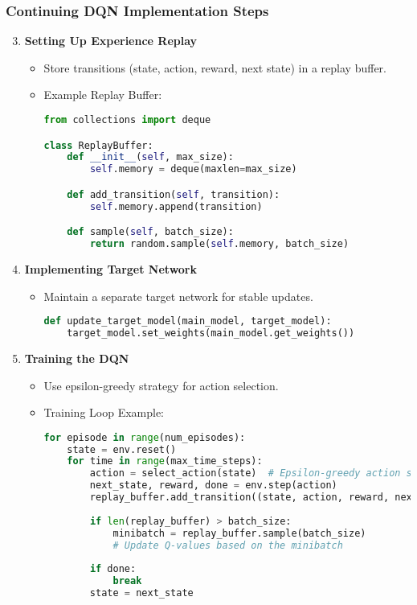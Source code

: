 \documentclass{beamer}
\begin{document}
\begin{frame}[fragile]
    \frametitle{Continuing DQN Implementation Steps}

    \begin{enumerate}
        \setcounter{enumi}{2}
        \item \textbf{Setting Up Experience Replay}
        \begin{itemize}
            \item Store transitions (state, action, reward, next state) in a replay buffer.
            \item Example Replay Buffer:
            \begin{lstlisting}[language=python]
from collections import deque

class ReplayBuffer:
    def __init__(self, max_size):
        self.memory = deque(maxlen=max_size)

    def add_transition(self, transition):
        self.memory.append(transition)

    def sample(self, batch_size):
        return random.sample(self.memory, batch_size)
            \end{lstlisting}
        \end{itemize}

        \item \textbf{Implementing Target Network}
        \begin{itemize}
            \item Maintain a separate target network for stable updates.
            \begin{lstlisting}[language=python]
def update_target_model(main_model, target_model):
    target_model.set_weights(main_model.get_weights())
            \end{lstlisting}
        \end{itemize}

        \item \textbf{Training the DQN}
        \begin{itemize}
            \item Use epsilon-greedy strategy for action selection.
            \item Training Loop Example:
            \begin{lstlisting}[language=python]
for episode in range(num_episodes):
    state = env.reset()
    for time in range(max_time_steps):
        action = select_action(state)  # Epsilon-greedy action selection
        next_state, reward, done = env.step(action)
        replay_buffer.add_transition((state, action, reward, next_state, done))
        
        if len(replay_buffer) > batch_size:
            minibatch = replay_buffer.sample(batch_size)
            # Update Q-values based on the minibatch
            
        if done:
            break
        state = next_state
            \end{lstlisting}
        \end{itemize}
    \end{enumerate}
\end{frame}
\end{document}
